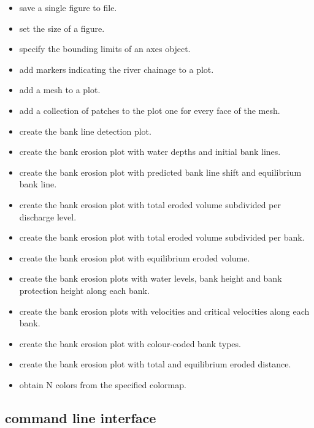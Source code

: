 \begin{itemize}
\item {} save a single figure to file.
\item {} set the size of a figure.
\item {} specify the bounding limits of an axes object.
\item {} add markers indicating the river chainage to a plot.
\item {} add a mesh to a plot.
\item {} add a collection of patches to the plot one for every face of the mesh.

\item {} create the bank line detection plot.

\item {} create the bank erosion plot with water depths and initial bank lines.
\item {} create the bank erosion plot with predicted bank line shift and equilibrium bank line.
\item {} create the bank erosion plot with total eroded volume subdivided per discharge level.
\item {} create the bank erosion plot with total eroded volume subdivided per bank.
\item {} create the bank erosion plot with equilibrium eroded volume.
\item {} create the bank erosion plots with water levels, bank height and bank protection height along each bank.
\item {} create the bank erosion plots with velocities and critical velocities along each bank.
\item {} create the bank erosion plot with colour-coded bank types.
\item {} create the bank erosion plot with total and equilibrium eroded distance.
\item {} obtain N colors from the specified colormap.
\end{itemize}

\subsection{command line interface }

